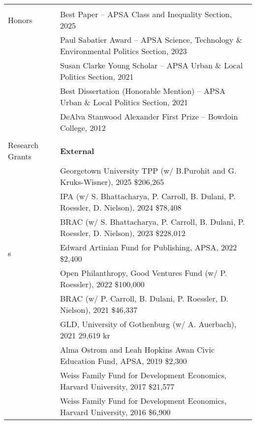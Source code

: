 \documentclass[letterpaper, 10.5pt]{article}
\begin{document}
\begin{longtable}{p{1.5in}p{5in}}
&\\




{{Honors}} 
& Best Paper -- APSA Class and Inequality Section, 2025\\
& Paul Sabatier Award -- APSA Science, Technology \& Environmental Politics Section, 2023\\
& Susan Clarke Young Scholar -- APSA Urban \& Local Politics Section, 2021\\

& Best Dissertation  (Honorable Mention) -- APSA Urban \& Local Politics Section, 2021 \\
& DeAlva Stanwood Alexander First Prize -- Bowdoin College, 2012 \\

& \\

{{Research Grants}} 
& \textbf{External}\\
& Georgetown University TPP (w/ B.Purohit and G. Kruks-Wisner), 2025 \hfill \$206,265\\
& IPA (w/ S. Bhattacharya, P. Carroll, B. Dulani, P. Roessler,  D. Nielson), 2024 \hfill \$78,408\\
& BRAC (w/ S. Bhattacharya, P. Carroll, B. Dulani, P. Roessler,  D. Nielson), 2023
 \hfill \$228,012\\
s
& Edward Artinian Fund for Publishing, APSA, 2022 \hfill \$2,400\\
& Open Philanthropy, Good Ventures Fund (w/ P. Roessler), 2022 \hfill \$100,000\\
& BRAC (w/ P. Carroll, B. Dulani, P. Roessler,  D. Nielson), 2021
 \hfill \$46,337\\


& GLD, University of Gothenburg (w/ A. Auerbach), 2021
\hfill 29,619 kr \\


& Alma Ostrom and Leah Hopkins Awan Civic Education Fund, APSA, 2019 \hfill \$2,300\\



& Weiss Family Fund for Development Economics, Harvard University, 2017
 \hfill \$21,577\\


&Weiss Family Fund for Development Economics, Harvard University, 2016 \hfill \$6,900  \\


\end{longtable}
\end{document}
